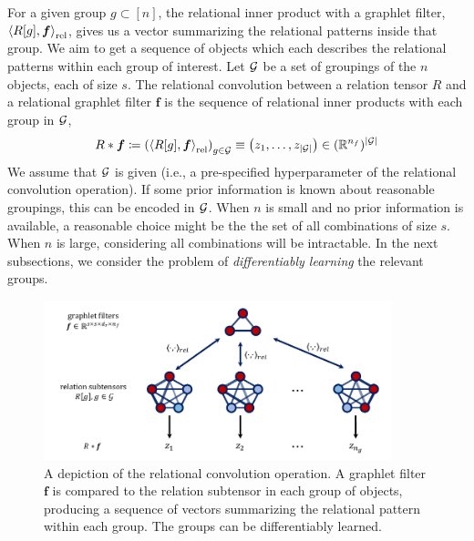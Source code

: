 For a given group $g \subset [n]$, the relational inner product with a graphlet filter, $\left \langle R[g], \bm{f} \right\rangle_\mathrm{rel}$, gives us a vector summarizing the relational patterns inside that group. We aim to get a sequence of objects which each describes the relational patterns within each group of interest. Let ${\mathcal{G}}$ be a set of groupings of the $n$ objects, each of size $s$. The relational convolution between a relation tensor $R$ and a relational graphlet filter $\bm{f}$ is the sequence of relational inner products with each group in ${\mathcal{G}}$,
\begin{equation}
    \label{eq:relational_convolution}
    R \ast \bm{f} \coloneq \left( \left\langle R[g], \boldsymbol{f} \right\rangle_\mathrm{rel} \right)_{g \in {\mathcal{G}}} \equiv \left(z_1, \ldots, z_{\left\lvert{\mathcal{G}}\right\rvert}\right) \in (\mathbb{R}^{n_f})^{\left\lvert{\mathcal{G}}\right\rvert}
\end{equation}
We assume that ${\mathcal{G}}$ is given (i.e., a pre-specified hyperparameter of the relational convolution operation). If some prior information is known about reasonable groupings, this can be encoded in ${\mathcal{G}}$. When $n$ is small and no prior information is available, a reasonable choice might be the the set of all combinations of size $s$. When $n$ is large, considering all combinations will be intractable. %
In the next subsections, we consider the problem of \textit{differentiably learning} the relevant groups.


\begin{figure}
    \vskip-10pt
    \centering
    \includegraphics[width=0.9\textwidth]{figs/relconv_figs_updated.pdf}
    \caption{A depiction of the relational convolution operation. A graphlet filter $\bm{f}$ is compared to the relation subtensor in each group of objects, producing a sequence of vectors summarizing the relational pattern within each group. The groups can be differentiably learned.
    }\label{fig:relconvdiagram}
\end{figure}

